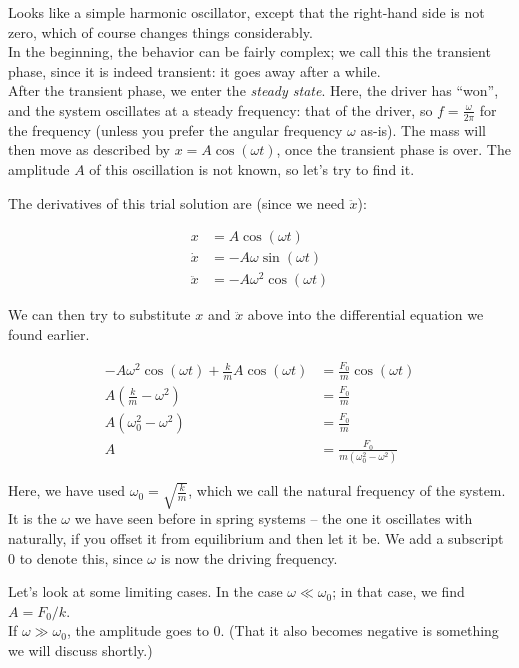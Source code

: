 Looks like a simple harmonic oscillator, except that the right-hand side is not zero, which of course changes things considerably.\\
In the beginning, the behavior can be fairly complex; we call this the transient phase, since it is indeed transient: it goes away after a while.\\
After the transient phase, we enter the \emph{steady state}. Here, the driver has ``won'', and the system oscillates at a steady frequency: that of the driver, so $\displaystyle f = \frac{\omega}{2 \pi}$ for the frequency (unless you prefer the angular frequency $\omega$ as-is). The mass will then move as described by $x = A \cos (\omega t)$, once the transient phase is over. The amplitude $A$ of this oscillation is not known, so let's try to find it.

The derivatives of this trial solution are (since we need $\ddot{x}$):

\begin{align}
x            &= A \cos (\omega t)\\
\dot{x}   &= -A \omega \sin(\omega t)\\
\ddot{x} &= -A \omega^2 \cos(\omega t)
\end{align}

We can then try to substitute $x$ and $\ddot{x}$ above into the differential equation we found earlier.

\begin{align}
-A \omega^2 \cos(\omega t) + \frac{k}{m} A \cos (\omega t) &=  \frac{F_0}{m} \cos (\omega t)\\
A\left(\frac{k}{m} - \omega^2\right)  &=  \frac{F_0}{m}\\
A\left(\omega_0^2 - \omega^2\right)  &=  \frac{F_0}{m}\\
A &=  \frac{F_0}{m\left(\omega_0^2 - \omega^2\right)}
\end{align}

Here, we have used $\displaystyle \omega_0 = \sqrt{\frac{k}{m}}$, which we call the natural frequency of the system. It is the $\omega$ we have seen before in spring systems -- the one it oscillates with naturally, if you offset it from equilibrium and then let it be. We add a subscript 0 to denote this, since $\omega$ is now the driving frequency.

Let's look at some limiting cases. In the case $\omega \ll \omega_0$; in that case, we find $A = F_0/k$.\\
If $\omega \gg \omega_0$, the amplitude goes to 0. (That it also becomes negative is something we will discuss shortly.)

